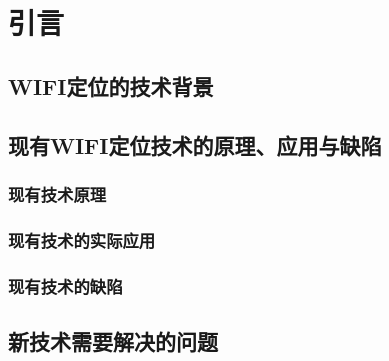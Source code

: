 \chapter{引言}

\section{WIFI定位的技术背景}

\section{现有WIFI定位技术的原理、应用与缺陷}
\subsection{现有技术原理}
\subsection{现有技术的实际应用}
\subsection{现有技术的缺陷}

\section{新技术需要解决的问题}
